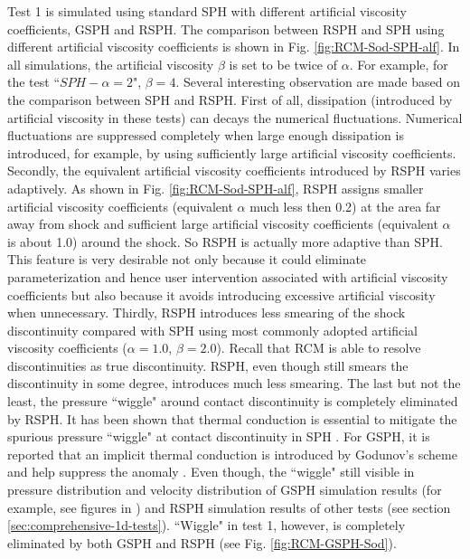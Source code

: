 Test 1 is simulated using standard SPH with different artificial viscosity coefficients, GSPH and RSPH. The comparison between RSPH and SPH using different artificial viscosity coefficients is shown in Fig. \ref{fig:RCM-Sod-SPH-alf}. In all simulations, the artificial viscosity $\beta$ is set to be twice of $\alpha$. For example, for the test ``$SPH-\alpha=2$", $\beta=4$. Several interesting observation are made based on the comparison between SPH and RSPH.
First of all, dissipation (introduced by artificial viscosity in these tests) can decays the numerical fluctuations. Numerical fluctuations are suppressed completely when large enough dissipation is introduced, for example, by using sufficiently large artificial viscosity coefficients.
Secondly, the equivalent artificial viscosity coefficients introduced by RSPH varies adaptively.
As shown in Fig. \ref{fig:RCM-Sod-SPH-alf}, RSPH assigns smaller artificial viscosity coefficients (equivalent $\alpha$ much less then 0.2) at the area far away from shock and sufficient large artificial viscosity coefficients (equivalent $\alpha$ is about 1.0) around the shock. So RSPH is actually more adaptive than SPH. This feature is very desirable not only because it could eliminate parameterization and hence user intervention associated with artificial viscosity coefficients but also because it avoids introducing excessive artificial viscosity when unnecessary.
Thirdly, RSPH introduces less smearing of the shock discontinuity compared with SPH using most commonly adopted artificial viscosity coefficients ($\alpha=1.0$, $\beta=2.0$). Recall that RCM is able to resolve discontinuities as true discontinuity. RSPH, even though still smears the discontinuity in some degree, introduces much less smearing.
The last but not the least, the pressure ``wiggle" around contact discontinuity is completely eliminated by RSPH. It has been shown that thermal conduction is essential to mitigate the spurious pressure ``wiggle" at contact discontinuity in SPH \citep{monaghan1997sph, sigalotti2006shock, price2008modelling, price2012smoothed}. For GSPH, it is reported that an implicit thermal conduction is introduced by Godunov's scheme and help suppress the anomaly \citep{puri2014approximate}. Even though, the ``wiggle" still visible in pressure distribution and velocity distribution of GSPH simulation results (for example, see figures in \citep{puri2014comparison}) and RSPH simulation results of other tests (see section \ref{sec:comprehensive-1d-tests}). ``Wiggle" in test 1, however, is completely eliminated by both GSPH and RSPH (see Fig. \ref{fig:RCM-GSPH-Sod}).

